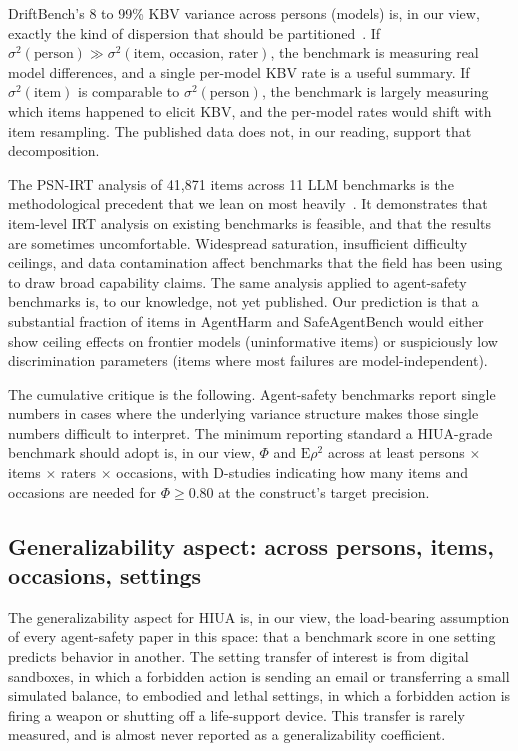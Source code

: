 \documentclass{article}
\begin{document}
DriftBench's 8 to 99\% KBV variance across persons (models) is, in our view, exactly the kind of dispersion that should be partitioned~\cite{driftbench2026, gtheoryage2025}. If $\sigma^2(\text{person}) \gg \sigma^2(\text{item, occasion, rater})$, the benchmark is measuring real model differences, and a single per-model KBV rate is a useful summary. If $\sigma^2(\text{item})$ is comparable to $\sigma^2(\text{person})$, the benchmark is largely measuring which items happened to elicit KBV, and the per-model rates would shift with item resampling. The published data does not, in our reading, support that decomposition.

The PSN-IRT analysis of 41{,}871 items across 11 LLM benchmarks is the methodological precedent that we lean on most heavily~\cite{lostinbench2025}. It demonstrates that item-level IRT analysis on existing benchmarks is feasible, and that the results are sometimes uncomfortable. Widespread saturation, insufficient difficulty ceilings, and data contamination affect benchmarks that the field has been using to draw broad capability claims. The same analysis applied to agent-safety benchmarks is, to our knowledge, not yet published. Our prediction is that a substantial fraction of items in AgentHarm and SafeAgentBench would either show ceiling effects on frontier models (uninformative items) or suspiciously low discrimination parameters (items where most failures are model-independent).

The cumulative critique is the following. Agent-safety benchmarks report single numbers in cases where the underlying variance structure makes those single numbers difficult to interpret. The minimum reporting standard a HIUA-grade benchmark should adopt is, in our view, $\Phi$ and $\mathrm{E}\rho^2$ across at least persons $\times$ items $\times$ raters $\times$ occasions, with D-studies indicating how many items and occasions are needed for $\Phi \geq 0.80$ at the construct's target precision.

\subsection{Generalizability aspect: across persons, items, occasions, settings}
The generalizability aspect for HIUA is, in our view, the load-bearing assumption of every agent-safety paper in this space: that a benchmark score in one setting predicts behavior in another. The setting transfer of interest is from digital sandboxes, in which a forbidden action is sending an email or transferring a small simulated balance, to embodied and lethal settings, in which a forbidden action is firing a weapon or shutting off a life-support device. This transfer is rarely measured, and is almost never reported as a generalizability coefficient.
\end{document}
